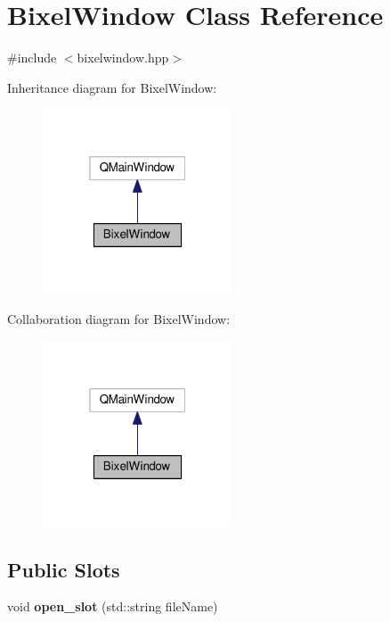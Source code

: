 \hypertarget{classBixelWindow}{\section{Bixel\-Window Class Reference}
\label{classBixelWindow}
}


{\ttfamily \#include $<$bixelwindow.\-hpp$>$}



Inheritance diagram for Bixel\-Window\-:\nopagebreak
\begin{figure}[H]
\begin{center}
\leavevmode
\includegraphics[width=160pt]{classBixelWindow__inherit__graph}
\end{center}
\end{figure}


Collaboration diagram for Bixel\-Window\-:\nopagebreak
\begin{figure}[H]
\begin{center}
\leavevmode
\includegraphics[width=160pt]{classBixelWindow__coll__graph}
\end{center}
\end{figure}
\subsection*{Public Slots}
\begin{DoxyCompactItemize}
\item 
\hypertarget{classBixelWindow_a4cb74f4db84d75a09598acba37f97268}{void {\bfseries open\-\_\-slot} (std\-::string file\-Name)}\label{classBixelWindow_a4cb74f4db84d75a09598acba37f97268}

\end{DoxyCompactItemize}
